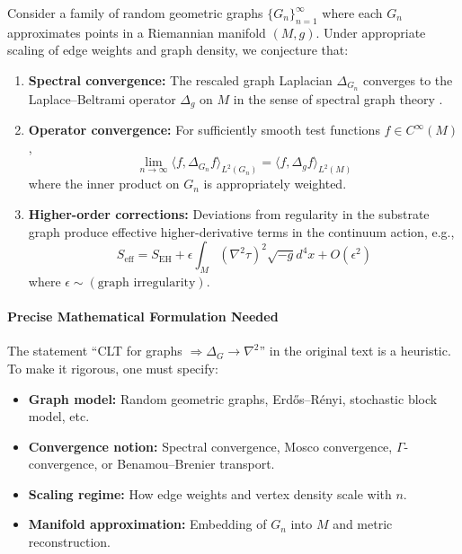 \documentclass[11pt,titlepage]{article}
\begin{document}
\begin{tcolorbox}[colback=yellow!5!white,colframe=yellow!75!black,title=Research Direction (Graph Continuum Limit)]
\label{conj:graph-limit}
Consider a family of random geometric graphs $\{G_n\}_{n=1}^\infty$ where each $G_n$ approximates points in a Riemannian manifold $(M,g)$. Under appropriate scaling of edge weights and graph density, we conjecture that:

\begin{enumerate}
\item \textbf{Spectral convergence:} The rescaled graph Laplacian $\Delta_{G_n}$ converges to the Laplace--Beltrami operator $\Delta_g$ on $M$ in the sense of spectral graph theory \cite{Chung1997}.

\item \textbf{Operator convergence:} For sufficiently smooth test functions $f \in C^\infty(M)$,
\[
\lim_{n \to \infty} \langle f, \Delta_{G_n} f \rangle_{L^2(G_n)} = \langle f, \Delta_g f \rangle_{L^2(M)}
\]
where the inner product on $G_n$ is appropriately weighted.

\item \textbf{Higher-order corrections:} Deviations from regularity in the substrate graph produce effective higher-derivative terms in the continuum action, e.g.,
\[
S_{\text{eff}} = S_{\text{EH}} + \epsilon \int_M (\nabla^2 \tau)^2 \sqrt{-g} d^4x + O(\epsilon^2)
\]
where $\epsilon \sim (\text{graph irregularity})$.
\end{enumerate}
\end{tcolorbox}

\paragraph{Precise Mathematical Formulation Needed}
The statement ``CLT for graphs $\Rightarrow \Delta_G \to \nabla^2$'' in the original text is a heuristic. To make it rigorous, one must specify:

\begin{itemize}
\item \textbf{Graph model:} Random geometric graphs, Erdős--Rényi, stochastic block model, etc.
\item \textbf{Convergence notion:} Spectral convergence, Mosco convergence, $\Gamma$-convergence, or Benamou--Brenier transport.
\item \textbf{Scaling regime:} How edge weights and vertex density scale with $n$.
\item \textbf{Manifold approximation:} Embedding of $G_n$ into $M$ and metric reconstruction.
\end{itemize}
\end{document}
